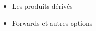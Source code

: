 \maketitle 
\vspace{50px}
\begin{center}
\begin{minipage}[c]{7.5cm}
    \begin{itemize}
        \LARGE
        \item[\color{black}\ding{235}] Les produits dérivés 
        \item[\color{black}  \ding{235}] Forwards et autres options
    \end{itemize}
\end{minipage}
\end{center}